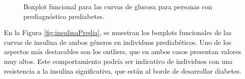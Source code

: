 \begin{figure}[H]
 \centering
    \caption{Boxplot funcional para las curvas de glucosa para personas con prediagnóstico prediabetes.}
    \label{fig:glucosaPredia}
\end{figure}


En la Figura \ref{fig:insulinaPredia}, se muestran los boxplots funcionales de las curvas de insulina de ambos géneros en individuos prediabéticos. Uno de los aspectos más destacables son los outliers, que en ambos casos presentan valores muy altos. Este comportamiento podría ser indicativo de individuos con una resistencia a la insulina significativa, que están al borde de desarrollar diabetes.

